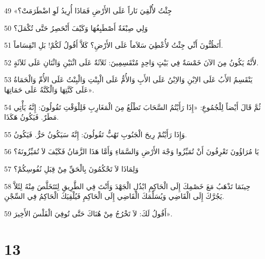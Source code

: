 \par 49 «جِئْتُ لأُلْقِيَ نَاراً عَلَى الأَرْضِ فَمَاذَا أُرِيدُ لَوِ اضْطَرَمَتْ؟
\par 50 وَلِي صِبْغَةٌ أَصْطَبِغُهَا وَكَيْفَ أَنْحَصِرُ حَتَّى تُكْمَلَ؟
\par 51 أَتَظُنُّونَ أَنِّي جِئْتُ لأُعْطِيَ سَلاَماً عَلَى الأَرْضِ؟ كَلاَّ أَقُولُ لَكُمْ! بَلِ انْقِسَاماً.
\par 52 لأَنَّهُ يَكُونُ مِنَ الآنَ خَمْسَةٌ فِي بَيْتٍ وَاحِدٍ مُنْقَسِمِينَ: ثَلاَثَةٌ عَلَى اثْنَيْنِ وَاثْنَانِ عَلَى ثَلاَثَةٍ.
\par 53 يَنْقَسِمُ الأَبُ عَلَى الاِبْنِ وَالاِبْنُ عَلَى الأَبِ وَالأُمُّ عَلَى الْبِنْتِ وَالْبِنْتُ عَلَى الأُمِّ وَالْحَمَاةُ عَلَى كَنَّتِهَا وَالْكَنَّةُ عَلَى حَمَاتِهَا».
\par 54 ثُمَّ قَالَ أَيْضاً لِلْجُمُوعِ: «إِذَا رَأَيْتُمُ السَّحَابَ تَطْلُعُ مِنَ الْمَغَارِبِ فَلِلْوَقْتِ تَقُولُونَ: إِنَّهُ يَأْتِي مَطَرٌ. فَيَكُونُ هَكَذَا.
\par 55 وَإِذَا رَأَيْتُمْ رِيحَ الْجَنُوبِ تَهُبُّ تَقُولُونَ: إِنَّهُ سَيَكُونُ حَرٌّ. فَيَكُونُ.
\par 56 يَا مُرَاؤُونَ تَعْرِفُونَ أَنْ تُمَيِّزُوا وَجْهَ الأَرْضِ وَالسَّمَاءِ وَأَمَّا هَذَا الزَّمَانُ فَكَيْفَ لاَ تُمَيِّزُونَهُ؟
\par 57 وَلِمَاذَا لاَ تَحْكُمُونَ بِالْحَقِّ مِنْ قِبَلِ نُفُوسِكُمْ؟
\par 58 حِينَمَا تَذْهَبُ مَعَ خَصْمِكَ إِلَى الْحَاكِمِ ابْذُلِ الْجَهْدَ وَأَنْتَ فِي الطَّرِيقِ لِتَتَخَلَّصَ مِنْهُ لِئَلاَّ يَجُرَّكَ إِلَى الْقَاضِي وَيُسَلِّمَكَ الْقَاضِي إِلَى الْحَاكِمِ فَيُلْقِيَكَ الْحَاكِمُ فِي السِّجْنِ.
\par 59 أَقُولُ لَكَ: لاَ تَخْرُجُ مِنْ هُنَاكَ حَتَّى تُوفِيَ الْفَلْسَ الأَخِيرَ».

\chapter{13}

